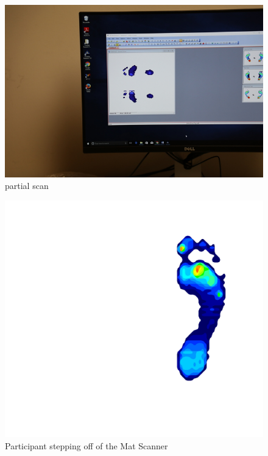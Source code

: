 \begin{figure}[!htp]
\centering
\includegraphics[scale=0.4]{Mat_Scan}
\caption{partial scan}
\label{Image 6}
\end{figure}

\begin{figure}[!htp]
\centering
\includegraphics[scale=0.15]{Mat_Foot}
\caption{Participant stepping off of the Mat Scanner}
\label{Image 7}
\end{figure}

